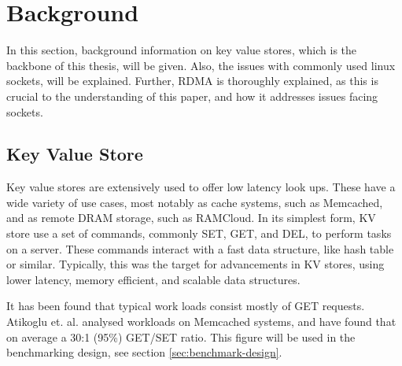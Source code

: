 
\chapter{Background}\label{ch:background} %



\ifpdf
    \graphicspath{{7/figures/PNG/}{7/figures/PDF/}{7/figures/}}
\else
    \graphicspath{{7/figures/EPS/}{7/figures/}}
\fi


%
%
In this section, background information on key value stores, which is the backbone of this thesis, will be given.
Also, the issues with commonly used linux sockets, will be explained.
Further, RDMA is thoroughly explained, as this is crucial to the understanding of this paper, and how it addresses issues facing sockets.

\section[KV-store]{Key Value Store}\label{sec:kv-store}
Key value stores are extensively used to offer low latency look ups.
These have a wide variety of use cases, most notably as cache systems, such as Memcached\cite{memcached}, and as remote DRAM storage, such as RAMCloud\cite{ousterhout2010case}.
In its simplest form, KV store use a set of commands, commonly SET, GET, and DEL, to perform tasks on a server.
These commands interact with a fast data structure, like hash table or similar.
Typically, this was the target for advancements in KV stores, using lower latency, memory efficient, and scalable data structures\cite{lim2014mica, escriva2012hyperdex}.

It has been found that typical work loads consist mostly of GET requests.
Atikoglu et. al. analysed workloads on Memcached systems, and have found that on average a 30:1 (95\%) GET/SET ratio\cite{atikoglu2012workload}.
This figure will be used in the benchmarking design, see section \ref{sec:benchmark-design}.

